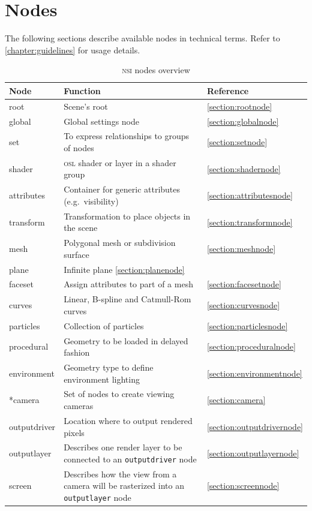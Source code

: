 \documentclass[oneside,ebook]{memoir}
\newcommand*{\acronym}[1]{\textsc{\lowercase{#1}}}
\begin{document}
\chapter{Nodes}
\label{chapter:Nodes}
The following sections describe available nodes in technical terms. Refer to \autoref{chapter:guidelines} for usage details.
\begin{table}[ht]
	\centering
	\begin{tabular}[c]{lp{18pc}l} \toprule
	\textbf{Node} & \textbf{Function} & \textbf{Reference} \\ \midrule
	root & Scene's root & \autoref{section:rootnode} \\
	global & Global settings node & \autoref{section:globalnode} \\
	set & To express relationships to groups of nodes & \autoref{section:setnode} \\
	shader & \acronym{OSL} shader or layer in a shader group & \autoref{section:shadernode} \\
	attributes & Container for generic attributes (e.g.\ visibility) & \autoref{section:attributesnode} \\
	transform & Transformation to place objects in the scene & \autoref{section:transformnode} \\
	mesh & Polygonal mesh or subdivision surface & \autoref{section:meshnode} \\
	plane & Infinite plane \autoref{section:planenode} \\
	faceset & Assign attributes to part of a mesh & \autoref{section:facesetnode} \\
	curves & Linear, B-spline and Catmull-Rom curves & \autoref{section:curvesnode} \\
	particles & Collection of particles & \autoref{section:particlesnode} \\
	procedural & Geometry to be loaded in delayed fashion & \autoref{section:proceduralnode} \\
	environment & Geometry type to define environment lighting & \autoref{section:environmentnode} \\
	*camera & Set of nodes to create viewing cameras & \autoref{section:camera}  \\
	outputdriver & Location where to output rendered pixels & \autoref{section:outputdrivernode}  \\
	outputlayer & Describes one render layer to be connected to an \lstinline|outputdriver| node & \autoref{section:outputlayernode} \\
	screen & Describes how the view from a camera will be rasterized into an \lstinline|outputlayer| node & \autoref{section:screennode} \\ \bottomrule
	\end{tabular}
	\caption{\acronym{nsi} nodes overview}
\end{table}
\end{document}
